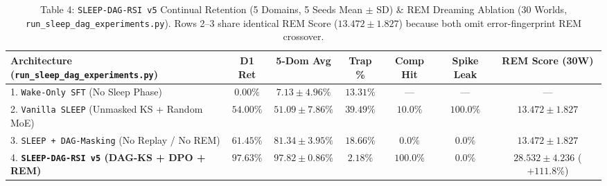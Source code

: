 \documentclass[11pt,a4paper]{article}
\begin{document}
\begin{table}[ht!]
\centering
\caption{Table 4: \texttt{SLEEP-DAG-RSI v5} Continual Retention (5 Domains, 5 Seeds Mean $\pm$ SD) \& REM Dreaming Ablation (30 Worlds, \texttt{run\_sleep\_dag\_experiments.py}). Rows 2--3 share identical REM Score ($13.472 \pm 1.827$) because both omit error-fingerprint REM crossover.}
\label{tab:sleep_v5}
\footnotesize
\begin{tabular}{p{4.8cm}cccccc}
\toprule
\textbf{Architecture (\texttt{run\_sleep\_dag\_experiments.py})} & \textbf{D1 Ret} & \textbf{5-Dom Avg} & \textbf{Trap \%} & \textbf{Comp Hit} & \textbf{Spike Leak} & \textbf{REM Score (30W)} \\
\midrule
1. \texttt{Wake-Only SFT} (No Sleep Phase) & $0.00\%$ & $7.13 \pm 4.96\%$ & $13.31\%$ & --- & --- & --- \\
2. \texttt{Vanilla SLEEP} (Unmasked KS + Random MoE) & $54.00\%$ & $51.09 \pm 7.86\%$ & $39.49\%$ & $10.0\%$ & $100.0\%$ & $13.472 \pm 1.827$ \\
3. \texttt{SLEEP + DAG-Masking} (No Replay / No REM) & $61.45\%$ & $81.34 \pm 3.95\%$ & $18.66\%$ & $0.0\%$ & $0.0\%$ & $13.472 \pm 1.827$ \\
4. \textbf{\texttt{SLEEP-DAG-RSI v5} (DAG-KS + DPO + REM)} & $\mathbf{97.63\%}$ & $\mathbf{97.82 \pm 0.86\%}$ & $\mathbf{2.18\%}$ & $\mathbf{100.0\%}$ & $\mathbf{0.0\%}$ & $\mathbf{28.532 \pm 4.236}$ ($\mathbf{+111.8\%}$) \\
\bottomrule
\end{tabular}
\end{table}
\end{document}
